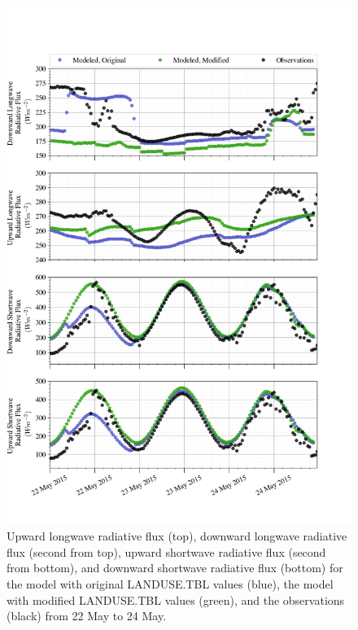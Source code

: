 \begin{figure}[H]
    \centering
    \vspace{-10em}
    \includegraphics[width=1\linewidth]{figures/chapter6/case3_lw_sw.png}
    \caption[Idealized Case 3 - Longwave radiative flux]{Upward longwave radiative flux (top), downward longwave radiative flux (second from top), upward shortwave radiative flux (second from bottom), and downward shortwave radiative flux (bottom) for the model with original LANDUSE.TBL values (blue), the model with modified LANDUSE.TBL values (green), and the observations (black) from 22 May to 24 May.}    
    \label{fig:c3:radiative}
\end{figure}

